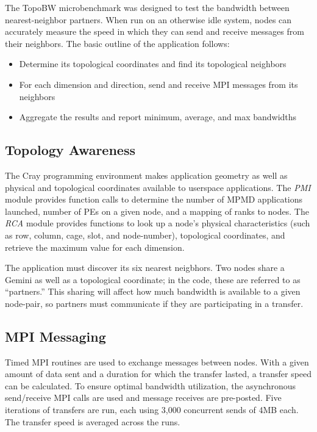 \documentclass[10pt, conference, compsocconf]{IEEEtran}
\begin{document}
The TopoBW microbenchmark was designed to test the bandwidth between
nearest-neighbor partners.  When run on an otherwise idle system, nodes can
accurately measure the speed in which they can send and receive messages from
their neighbors.  The basic outline of the application follows:

\begin{itemize}
	\item Determine its topological coordinates and find its topological neighbors
	\item For each dimension and direction, send and receive MPI messages from its neighbors
	\item Aggregate the results and report minimum, average, and max bandwidths
\end{itemize}

\subsection{Topology Awareness}

The Cray programming environment makes application geometry as well as physical
and topological coordinates available to userspace applications.  The
\emph{PMI} module provides function calls to determine the number of MPMD
applications launched, number of PEs on a given node, and a mapping of ranks to
nodes.  The \emph{RCA} module provides functions to look up a node's physical
characteristics (such as row, column, cage, slot, and node-number), topological
coordinates, and retrieve the maximum value for each dimension.

The application must discover its six nearest neigbhors.  Two nodes share a
Gemini as well as a topological coordinate;  in the code, these are referred to
as ``partners.''  This sharing will affect how much bandwidth is available to a
given node-pair, so partners must communicate if they are participating in a
transfer.

\subsection{MPI Messaging}

Timed MPI routines are used to exchange messages between nodes.  With a given
amount of data sent and a duration for which the transfer lasted, a transfer
speed can be calculated.  To ensure optimal bandwidth utilization, the
asynchronous send/receive MPI calls are used and message receives are
pre-posted.  Five iterations of transfers are run, each using 3,000 concurrent
sends of 4MB each.  The transfer speed is averaged across the runs.
\end{document}
